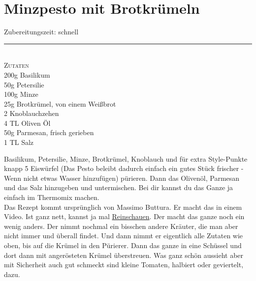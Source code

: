 

\section{Minzpesto mit Brotkrümeln}
\begin{minipage}[t]{0.3\textwidth}
    Zubereitungszeit: schnell\\
    \noindent\rule[1ex]{\textwidth}{1pt}\\
    \textsc{Zutaten}\\
    200g Basilikum\\
    50g Petersilie\\
    100g Minze\\
    25g Brotkrümel, von einem Weißbrot\\
    2 Knoblauchzehen\\
    4 TL Oliven Öl\\
    50g Parmesan, frisch gerieben\\
    1 TL Salz\\
\end{minipage}
\begin{minipage}[t]{0.69\textwidth}
    Basilikum, Petersilie, Minze, Brotkrümel, Knoblauch und für extra Style-Punkte knapp 5 Eiswürfel (Das Pesto beleibt dadurch einfach ein gutes Stück frischer - Wenn nicht etwas Wasser hinzufügen) pürieren. Dann das Olivenöl, Parmesan und das Salz hinzugeben und untermischen. Bei dir kannst du das Ganze ja einfach im Thermomix machen.\\
    Das Rezept kommt ursprünglich von Massimo Buttura. Er macht das in einem Video. Ist ganz nett, kannst ja mal \href{https://youtu.be/adyRuV2eJlM}{Reinschauen}. Der macht das ganze noch ein wenig anders. Der nimmt nochmal ein bisschen andere Kräuter, die man aber nicht immer und überall findet. Und dann nimmt er eigentlich alle Zutaten wie oben, bis auf die Krümel in den Pürierer. Dann das ganze in eine Schüssel und dort dann mit angerösteten Krümel überstreuen. Was ganz schön aussieht aber mit Sicherheit auch gut schmeckt sind kleine Tomaten, halbiert oder geviertelt, dazu.
\end{minipage}
\newpage